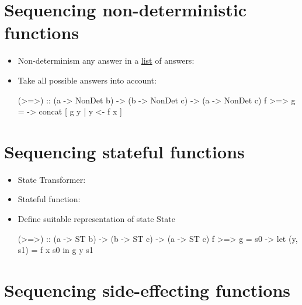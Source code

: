 

\section{Sequencing non-deterministic functions }

\begin{itemize}
    \item Non-determinism any answer in a \underline{list} of answers:\\
    \item Take all possible answers into account:\\
\begin{codebox}[haskell]
(>=>) :: (a -> NonDet b) -> (b -> NonDet c) -> (a -> NonDet c)
f >=> g = \x -> concat [ g y | y <- f x ]
\end{codebox}
\end{itemize}


\section{Sequencing stateful functions }

\begin{itemize}
    \item State Transformer: 
    \item Stateful function: 
    \item Define suitable representation of state State
\begin{codebox}[haskell]
(>=>) :: (a -> ST b) -> (b -> ST c) -> (a -> ST c)
f >=> g = \x s0 -> let (y, s1) = f x s0
                   in g y s1
\end{codebox}
\end{itemize}





\section{Sequencing side-effecting functions }

